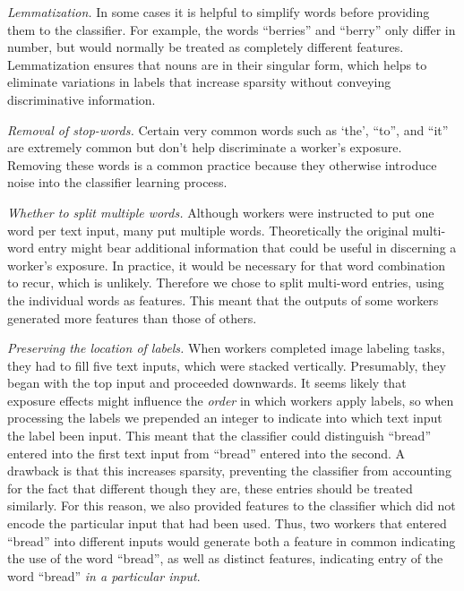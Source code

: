 \documentclass[12pt]{article}
\begin{document}
	\textit{Lemmatization.}  In some cases it is helpful to simplify words 
	before providing them to the classifier.  For example, the words 
	``berries'' and ``berry'' only differ in number, but would normally be
	treated as completely different features.  Lemmatization ensures that
	nouns are in their singular form, which helps to eliminate variations in
	labels that increase sparsity without conveying discriminative 
	information.

	\textit{Removal of stop-words.}  Certain very common words such as `the',
	``to'', and ``it'' are extremely common but don't help discriminate a 
	worker's exposure.  Removing these words is a common practice because
	they otherwise introduce noise into the classifier learning process.

	\textit{Whether to split multiple words.}  Although workers were 
	instructed to put one word per text input, many put multiple words.
	Theoretically the original multi-word entry might bear additional 
	information that could be useful in discerning a worker's exposure. 
	In practice, it would be necessary for that word combination to recur,
	which is unlikely.  Therefore we chose to split multi-word entries,
	using the individual words as features.  This meant that the outputs of
	some workers generated more features than those of others.

	\textit{Preserving the location of labels.}  When workers completed image
	labeling tasks, they had to fill five text inputs, which were stacked
	vertically.  Presumably, they began with the top input and proceeded 
	downwards.  It seems likely that exposure effects might influence the
	\textit{order} in which workers apply labels, so when processing the 
	labels we prepended an integer to indicate into which text input the 
	label been input.  This meant that the classifier could distinguish
	``bread'' entered into the first text input from ``bread'' entered into
	the second.  A drawback is that this increases sparsity, preventing the
	classifier from accounting for the fact that different though they are,
	these entries should be treated similarly.  For this reason, we also
	provided features to the classifier which did not encode the particular
	input that had been used.  Thus, two workers that entered ``bread''
	into different inputs would generate both a feature in common indicating
	the use of the word ``bread'', as well as distinct features, indicating
	entry of the word ``bread'' \textit{in a particular input}.
\end{document}

